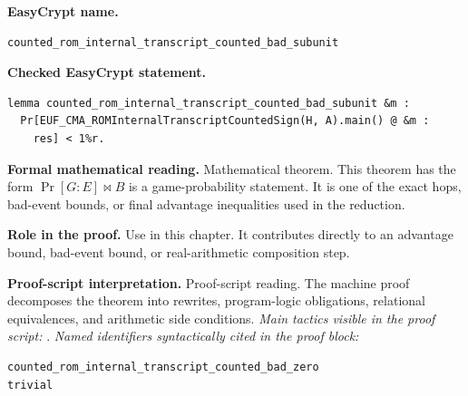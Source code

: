 \begin{formaltheorem}
\noindent\textbf{EasyCrypt name.}
\begin{lstlisting}[language=EasyCrypt,basicstyle=\ttfamily\scriptsize]
counted_rom_internal_transcript_counted_bad_subunit
\end{lstlisting}
\noindent\textbf{Checked EasyCrypt statement.}
\begin{lstlisting}[language=EasyCrypt,basicstyle=\ttfamily\scriptsize]
lemma counted_rom_internal_transcript_counted_bad_subunit &m :
  Pr[EUF_CMA_ROMInternalTranscriptCountedSign(H, A).main() @ &m :
    res] < 1%r.
\end{lstlisting}
\noindent\textbf{Formal mathematical reading.}
Mathematical theorem. This theorem has the form \(\Pr[G:E] \bowtie B\) is a game-probability statement.  It is one of the exact hops, bad-event bounds, or final advantage inequalities used in the reduction.

\noindent\textbf{Role in the proof.}
Use in this chapter. It contributes directly to an advantage bound, bad-event bound, or real-arithmetic composition step.

\noindent\textbf{Proof-script interpretation.}
Proof-script reading. The machine proof decomposes the theorem into rewrites, program-logic obligations, relational equivalences, and arithmetic side conditions.
\emph{Main tactics visible in the proof script:} .
\emph{Named identifiers syntactically cited in the proof block:}
\begin{lstlisting}[language=EasyCrypt,basicstyle=\ttfamily\scriptsize]
counted_rom_internal_transcript_counted_bad_zero
trivial
\end{lstlisting}

\end{formaltheorem}

